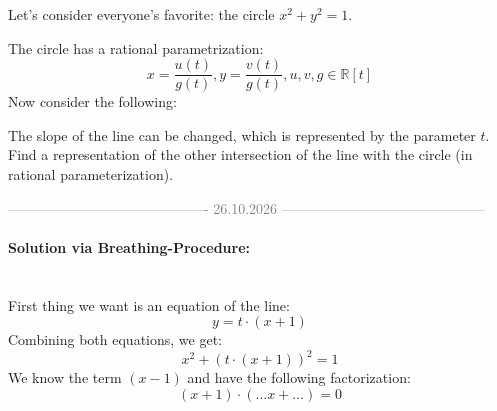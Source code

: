 \begin{example}[title = Example 1.3.3 (Quadratic Case)]
  Let's consider everyone's favorite: the circle $x^2 + y^2 = 1$. 

  The circle has a rational parametrization: \[x = \frac{u(t)}{g(t)}, y = \frac{v(t)}{g(t)}, u, v, g \in \mathbb{R}[t]\]  
  Now consider the following:  

  \begin{minipage}{0.39\textwidth}
    \begin{center}
    \end{center}
  \end{minipage}
  \hspace*{0.2cm}
  \begin{minipage}{0.59\textwidth}
    The slope of the line can be changed, which is represented by the parameter $t$. Find a representation of the other intersection of the line with the circle (in rational parameterization).
  \end{minipage}
  \begin{center}
    \textcolor{gray}{------------------------------------------- 26.10.2026 --------------------------------------------} \\[0.3em]
  \end{center} 

  \paragraph{Solution via Breathing-Procedure:}\ \\
  First thing we want is an equation of the line: 
  \[y = t \cdot (x+1)\]
  Combining both equations, we get: \[x^2 + (t \cdot (x+1))^2 = 1\]
  We know the term $(x-1)$ and have the following factorization: 
  \[(x + 1) \cdot (\ldots x + \ldots) = 0\] 
\end{example} 
